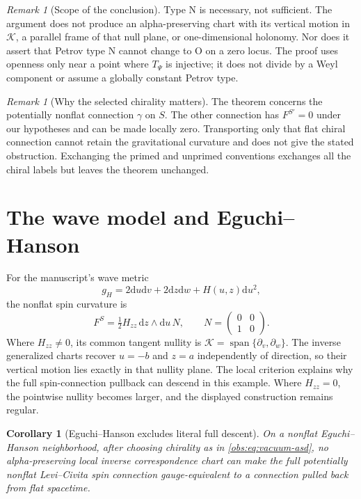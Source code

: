 \documentclass[11pt]{article}
\newtheorem{corollary}[theorem]{Corollary}
\theoremstyle{definition}
\theoremstyle{remark}
\newtheorem{remark}[theorem]{Remark}
\newcommand{\dd}{\mathrm d}
\begin{document}
\begin{remark}[Scope of the conclusion]
Type N is necessary, not sufficient. The argument does not produce an
alpha-preserving chart with its vertical motion in $\mathcal K$, a
parallel frame of that null plane, or one-dimensional holonomy. Nor does
it assert that Petrov type N cannot change to O on a zero locus. The proof
uses openness only near a point where $T_\Psi$ is injective; it does not
divide by a Weyl component or assume a globally constant Petrov type.
\end{remark}

\begin{remark}[Why the selected chirality matters]
The theorem concerns the potentially nonflat connection $\gamma$ on $S$.
The other connection has $F^{S'}=0$ under our hypotheses and can be made
locally zero. Transporting only that flat chiral connection cannot retain
the gravitational curvature and does not give the stated obstruction.
Exchanging the primed and unprimed conventions exchanges all the chiral
labels but leaves the theorem unchanged.
\end{remark}

\section{The wave model and Eguchi--Hanson}

For the manuscript's wave metric
\[
 g_H=2\dd u\dd v+2\dd z\dd w+H(u,z)\dd u^2,
\]
the nonflat spin curvature is
\[
 F^S=\tfrac12H_{zz}\,\dd z\wedge\dd u\,N,
 \qquad N=\begin{pmatrix}0&0\\1&0\end{pmatrix}.
\]
Where $H_{zz}\ne0$, its common tangent nullity is
$\mathcal K=\operatorname{span}\{\partial_v,\partial_w\}$.
The inverse generalized charts recover $u=-b$ and $z=a$ independently of
direction, so their vertical motion lies exactly in that nullity plane.
The local criterion explains why the full spin-connection pullback can
descend in this example. Where $H_{zz}=0$, the pointwise nullity becomes
larger, and the displayed construction remains regular.

\begin{corollary}[Eguchi--Hanson excludes literal full descent]
\label{obs:cor:eh}
On a nonflat Eguchi--Hanson neighborhood, after choosing chirality as in
\eqref{obs:eq:vacuum-asd}, no alpha-preserving local inverse correspondence
chart can make the full potentially nonflat Levi--Civita spin connection
gauge-equivalent to a connection pulled back from flat spacetime.
\end{corollary}
\end{document}
